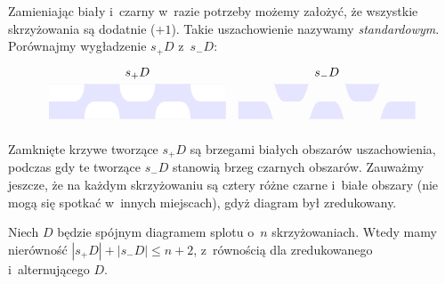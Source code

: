 Zamieniając biały i~czarny w~razie potrzeby możemy założyć, że wszystkie skrzyżowania są dodatnie ($+1$).
Takie uszachowienie nazywamy \emph{standardowym}.
Porównajmy wygładzenie $s_+D$ z~$s_-D$:
\[
    \begin{tikzpicture}[baseline=-0.65ex,scale=0.10]
        \node at (0, 8) {$s_+D$};
        \draw[fill=blue!10!white,draw=none] (-25, -5) rectangle (25, 5);
        \draw[fill=white, draw=none] (-15, -5) [in=left, out=up] to (-12, 0) -- (-8, 0) [in=up, out=right] to (-5, -5);
        \draw[fill=white, draw=none] (5, -5) [in=left, out=up] to (8, 0) -- (12, 0) [in=up, out=right] to (15, -5);
        \draw[fill=white, draw=none] (-5, 5) [in=left, out=down] to (-2, 0) -- (2, 0) [in=down, out=right] to (5, 5);
        \draw[fill=white, draw=none] (-25, 0) -- (-18, 0) [in=down, out=right] to (-15, 5) -- (-25, 5);
        \draw[fill=white, draw=none] ( 25, 0) -- ( 18, 0) [in=down, out=left] to ( 15, 5) -- ( 25, 5);
    \end{tikzpicture}
    \quad
    \begin{tikzpicture}[baseline=-0.65ex,scale=0.10]
        \node at (0, 8) {$s_-D$};
        \draw[fill=blue!10!white, draw=none] (-15, 5) [in=left, out=up] to (-12, 0) -- (-8, 0) [in=up, out=right] to (-5, 5);
        \draw[fill=blue!10!white, draw=none] (5, 5) [in=left, out=up] to (8, 0) -- (12, 0) [in=up, out=right] to (15, 5);
        \draw[fill=blue!10!white, draw=none] (-5, -5) [in=left, out=down] to (-2, 0) -- (2, 0) [in=down, out=right] to (5, -5);
        \draw[fill=blue!10!white, draw=none] (-25, 0) -- (-18, 0) [in=down, out=right] to (-15, -5) -- (-25, -5);
        \draw[fill=blue!10!white, draw=none] ( 25, 0) -- ( 18, 0) [in=down, out=left] to ( 15, -5) -- ( 25, -5);
    \end{tikzpicture}
\]

Zamknięte krzywe tworzące $s_+D$ są brzegami białych obszarów uszachowienia,
podczas gdy te tworzące $s_-D$ stanowią brzeg czarnych obszarów.
Zauważmy jeszcze, że na każdym skrzyżowaniu są cztery różne czarne i~białe obszary
(nie mogą się spotkać w~innych miejscach), gdyż diagram był zredukowany.

\begin{lemma}
Niech $D$ będzie spójnym diagramem splotu o~$n$ skrzyżowaniach.
Wtedy mamy nierówność $|s_+D|+|s_-D|\le n+2$, z~równością dla zredukowanego i~alternującego $D$.
\end{lemma}


